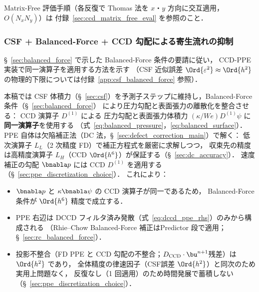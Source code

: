 Matrix-Free 評価手順（各反復で Thomas 法を $x$・$y$ 方向に交互適用，$O(N_x N_y)$）は
付録~\ref{sec:ccd_matrix_free_eval} を参照のこと．

\subsubsection{CSF + Balanced-Force + CCD 勾配による寄生流れの抑制}
\label{sec:ccd_balanced_force}

§~\ref{sec:balanced_force} で示した Balanced-Force 条件の要請に従い，
CCD-PPE 実装で同一演算子を適用する方法を示す
（CSF 近似誤差 $\Ord{\varepsilon^2} \approx \Ord{h^2}$ の物理的下限については付録~\ref{app:csf_balanced_force} 参照）．

本稿では CSF 体積力（§~\ref{sec:csf}）を予測子ステップに維持し，Balanced-Force 条件（§~\ref{sec:balanced_force}）
により圧力勾配と表面張力の離散化を整合させる：
CCD 演算子 $D^{(1)}$ による
圧力勾配と表面張力体積力 $(\kappa/We)D^{(1)}\psi$ に\textbf{同一演算子}を使用する
（式~\eqref{eq:balanced_pressure}，\eqref{eq:balanced_surface}）．
PPE 自体は欠陥補正法（DC 法，§~\ref{sec:defect_correction_main}）で解く：
低次演算子 $L_L$（2 次精度 FD）で補正方程式を厳密に求解しつつ，
収束先の精度は高精度演算子 $L_H$（CCD $\Ord{h^6}$）が保証する（§~\ref{sec:dc_accuracy}）．
速度補正の勾配 $\bnabla p$ には CCD $D^{(1)}$ を適用する（§~\ref{sec:ppe_discretization_choice}）．
これにより：
\begin{itemize}
  \item $\bnabla p$ と $\kappa\bnabla\psi$ の CCD 演算子が同一であるため，
        Balanced-Force 条件が $\Ord{h^6}$ 精度で成立する．
  \item PPE 右辺は DCCD フィルタ済み発散（式~\eqref{eq:dccd_ppe_rhs}）のみから構成される
        （Rhie--Chow Balanced-Force 補正はPredictor 段で適用；§~\ref{sec:rc_balanced_force}）．
  \item 投影不整合（FD PPE と CCD 勾配の不整合；$D_\mathrm{CCD}\cdot\bu^{n+1}$残差）は $\Ord{h^2}$ であり，
        全体精度の律速因子（CSF誤差 $\Ord{h^2}$）と同次のため実用上問題なく，
        反復なし（1 回適用）のため時間発展で蓄積しない（§~\ref{sec:ppe_discretization_choice}）．
\end{itemize}

